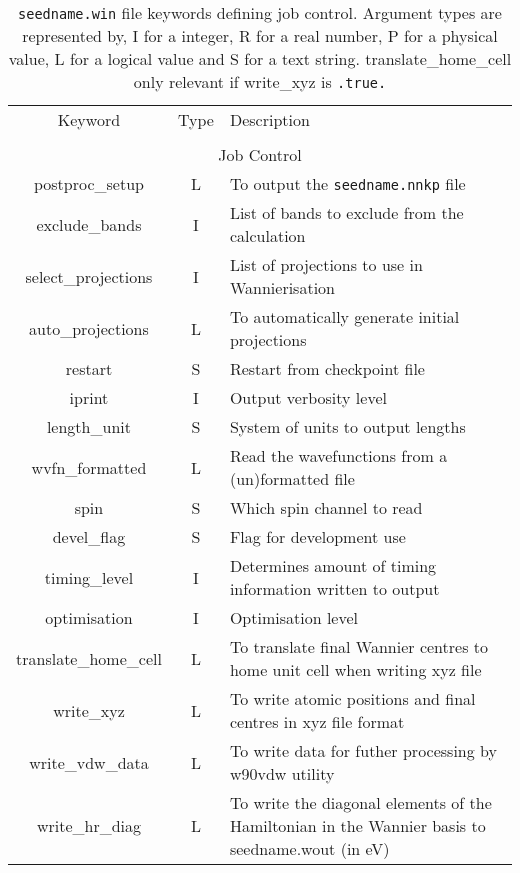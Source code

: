 \clearpage

\begin{table}
\begin{center}
\begin{tabular}{|c|c|p{6cm}|}
\hline
Keyword & Type & Description \\
        &      &             \\
\hline\hline
\multicolumn{3}{|c|}{Job Control} \\
\hline
{\sc postproc\_setup }   & L & To output the {\tt seedname.nnkp} file \\
{\sc exclude\_bands }   & I & List of bands to exclude from the calculation \\
{\sc select\_projections }   & I & List of projections to use in Wannierisation \\
{\sc auto\_projections } & L & To automatically generate initial projections \\
{\sc restart }   & S & Restart from checkpoint file \\
{\sc iprint }   & I & Output verbosity level \\
{\sc length\_unit }   & S & System of units to output lengths \\
{\sc wvfn\_formatted }   & L & Read the wavefunctions from a  (un)formatted file  \\
{\sc spin }   & S & Which spin channel to read \\
{\sc devel\_flag }   & S & Flag for development use \\
{\sc timing\_level } & I & Determines amount of timing information
written to output \\
{\sc optimisation } & I & Optimisation level \\
{\sc translate\_home\_cell } & L & To translate final Wannier centres
to home unit cell when writing xyz file\\
{\sc write\_xyz }  & L & To write atomic positions and final centres in xyz file format \\
{\sc write\_vdw\_data }  & L & To write data for futher processing by w90vdw utility\\
{\sc write\_hr\_diag }  & L & To write the diagonal elements of
the Hamiltonian in the Wannier basis to seedname.wout (in eV)\\
\hline
\end{tabular}
\caption[win file keywords.]
{{\tt seedname.win} file keywords defining job control.  Argument types
are represented by, I for a integer, R for a real number, P for a
physical value, L for a logical value and S for a text string. {\sc
  translate\_home\_cell } only relevant if {\sc write\_xyz} is
\texttt{.true.}}
\label{parameter_keywords2}
\end{center}
\end{table}





